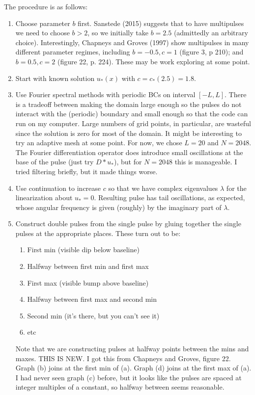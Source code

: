 \documentclass[12pt]{article}
\begin{document}
The procedure is as follows:
\begin{enumerate}
	\item Choose parameter $b$ first. Sanstede (2015) suggests that to have multipulses we need to choose $b > 2$, so we initially take $b = 2.5$ (admittedly an arbitrary choice). Interestingly, Chapneys and Groves (1997) show multipulses in many different parameter regimes, including $b = -0.5, c = 1$ (figure 3, p 210); and $b = 0.5, c = 2$ (figure 22, p. 224). These may be work exploring at some point.
	\item Start with known solution $u_*(x)$ with $c = c_*(2.5) = 1.8$.
	\item Use Fourier spectral methods with periodic BCs on interval $[-L, L]$. There is a tradeoff between making the domain large enough so the pulses do not interact with the (periodic) boundary and small enough so that the code can run on my computer. Large numbers of grid points, in particular, are wasteful since the solution is zero for most of the domain. It might be interesting to try an adaptive mesh at some point. For now, we chose $L = 20$ and $N = 2048$. The Fourier differentiation operator does introduce small oscillations at the base of the pulse (just try $D*u_*$), but for $N = 2048$ this is manageable. I tried filtering briefly, but it made things worse.
	\item Use continuation to increase $c$ so that we have complex eigenvalues $\lambda$ for the linearization about $u_* = 0$. Resulting pulse has tail oscillations, as expected, whose angular frequency is given (roughly) by the imaginary part of $\lambda$.
	\item Construct double pulses from the single pulse by gluing together the single pulses at the appropriate places. These turn out to be:
		\begin{enumerate}
			\item First min (visible dip below baseline)
			\item Halfway between first min and first max
			\item First max (visible bump above baseline)
			\item Halfway between first max and second min
			\item Second min (it's there, but you can't see it)
			\item etc
		\end{enumerate}
	Note that we are constructing pulses at halfway points between the mins and maxes. THIS IS NEW. I got this from Chapneys and Groves, figure 22. Graph (b) joins at the first min of (a). Graph (d) joins at the first max of (a). I had never seen graph (c) before, but it looks like the pulses are spaced at integer multiples of a constant, so halfway between seems reasonable.
\end{enumerate}
\end{document}
